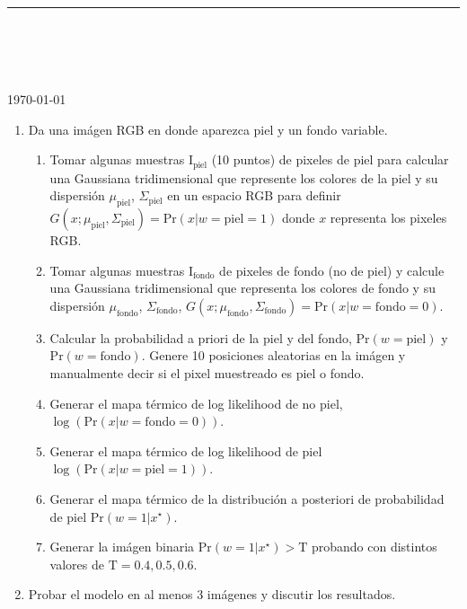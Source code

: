 



\thispagestyle{empty}

\begin{center}
\textsc{\theinstitution}\\[2mm]

\thedepartment

\rule{0.6\textwidth}{0.5pt}\\[2mm]

\thecourse \\[4mm]

{\Large \textbf{\thetitle}}\\[2mm]

\theauthor \\[2mm]

{\small \today}
\end{center}
\medskip

\vspace{1cm}

\begin{enumerate}
    \item Da una imágen RGB en donde aparezca piel y un fondo variable.
    \begin{enumerate}
        \item Tomar algunas muestras $\text{I}_{\text{piel}}$ (10 puntos) de pixeles de piel para calcular una Gaussiana tridimensional que represente los colores de la piel y su dispersión $\mu_{\text{piel}}$, $\Sigma_{\text{piel}}$ en un espacio RGB para definir $G(x; \mu_{\text{piel}}, \Sigma_{\text{piel}}) = \text{Pr}(x | w = \text{piel} = 1)$ donde $x$ representa los pixeles RGB.
        \item Tomar algunas muestras $\text{I}_{\text{fondo}}$ de pixeles de fondo (no de piel) y calcule una Gaussiana tridimensional que representa los colores de fondo y su dispersión $\mu_{\text{fondo}}$, $\Sigma_{\text{fondo}}$, $G(x; \mu_{\text{fondo}}, \Sigma_{\text{fondo}}) = \text{Pr}(x | w = \text{fondo} = 0)$.
        \item Calcular la probabilidad a priori de la piel y del fondo, $\text{Pr}(w = \text{piel})$ y $\text{Pr}(w = \text{fondo})$. Genere 10 posiciones aleatorias en la imágen y manualmente decir si el pixel muestreado es piel o fondo.
        \item Generar el mapa térmico de log likelihood de no piel, $\log(\text{Pr}(x | w = \text{fondo} = 0))$.
        \item Generar el mapa térmico de log likelihood de piel $\log(\text{Pr}(x | w = \text{piel} = 1))$.
        \item Generar el mapa térmico de la distribución a posteriori de probabilidad de piel $\text{Pr}(w = 1 | x^{\star})$.
        \item Generar la imágen binaria $\text{Pr}(w = 1 | x^{\star}) > \text{T}$ probando con distintos valores de $\text{T} = 0.4, 0.5, 0.6$.
    \end{enumerate}
    \item Probar el modelo en al menos 3 imágenes y discutir los resultados.
\end{enumerate}

